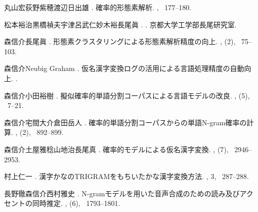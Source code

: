 \documentclass[japanese]{jnlp_JS2.0}
\begin{document}
\begin{thebibliography}{}
丸山宏\JBA 荻野紫穂\JBA 渡辺日出雄 \BBCP.
\newblock 確率的形態素解析. 
\newblock {}, \mbox{\BPGS\ 177--180}.

松本裕治\JBA 黒橋禎夫\JBA 宇津呂武仁\JBA 妙木裕\JBA 長尾眞 \BBCP.
\newblock {}.
\newblock 京都大学工学部長尾研究室.

森信介\JBA 長尾眞 \BBCP.
\newblock 形態素クラスタリングによる形態素解析精度の向上. 
\newblock {}, {}  (2), \mbox{\BPGS\ 75--103}.

森信介\JBA Neubig Graham  \BBCP.
\newblock 仮名漢字変換ログの活用による言語処理精度の自動向上. 
\newblock {}.

森信介\JBA 小田裕樹 \BBCP.
\newblock 擬似確率的単語分割コーパスによる言語モデルの改良. 
\newblock {}, {}  (5), \mbox{\BPGS\ 7--21}.

森信介\JBA 宅間大介\JBA 倉田岳人 \BBCP.
\newblock 確率的単語分割コーパスからの単語N-gram確率の計算. 
\newblock {}, {}  (2), \mbox{\BPGS\ 892--899}.

森信介\JBA 土屋雅稔\JBA 山地治\JBA 長尾真 \BBCP.
\newblock 確率的モデルによる仮名漢字変換. 
\newblock {}, {}  (7), \mbox{\BPGS\ 2946--2953}.

村上仁一 \BBCP.
\newblock 漢字かなのTRIGRAMをもちいたかな漢字変換方法. 
\newblock {}, 3\JVOL, \mbox{\BPGS\ 287--288}.

長野徹\JBA 森信介\JBA 西村雅史 \BBCP.
\newblock N-gramモデルを用いた音声合成のための読み及びアクセントの同時推定. 
\newblock {}, {}  (6), \mbox{\BPGS\ 1793--1801}.


\end{thebibliography}
\end{document}
